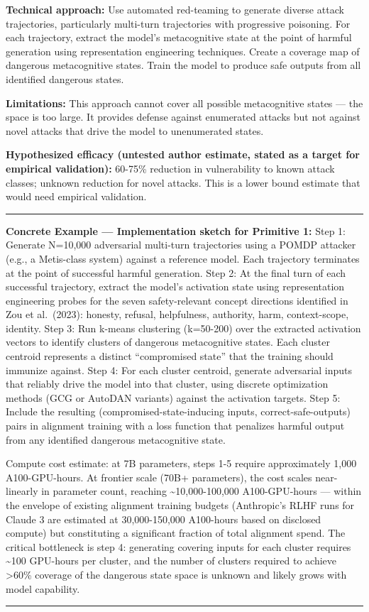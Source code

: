 \documentclass[
  11pt,
]{article}
\renewenvironment{quote}{%
  \par\addvspace{0.7em}%
  \noindent\rule{\linewidth}{1.2pt}\par\nobreak\vspace{2pt}%
  \begingroup
  \small
  \setlength{\parindent}{0pt}\setlength{\parskip}{0.3em}%
  \setlength{\leftskip}{0.9em}\setlength{\rightskip}{0.4em}%
  \ignorespaces
}{%
  \par\endgroup\vspace{2pt}%
  \noindent\rule{\linewidth}{0.4pt}\par\addvspace{0.7em}%
}
\begin{document}
\textbf{Technical approach:} Use automated red-teaming to generate
diverse attack trajectories, particularly multi-turn trajectories with
progressive poisoning. For each trajectory, extract the model's
metacognitive state at the point of harmful generation using
representation engineering techniques. Create a coverage map of
dangerous metacognitive states. Train the model to produce safe outputs
from all identified dangerous states.

\textbf{Limitations:} This approach cannot cover all possible
metacognitive states --- the space is too large. It provides defense
against enumerated attacks but not against novel attacks that drive the
model to unenumerated states.

\textbf{Hypothesized efficacy (untested author estimate, stated as a target for empirical validation):} 60-75\% reduction in vulnerability to known
attack classes; unknown reduction for novel attacks. This is a lower
bound estimate that would need empirical validation.

\begin{quote}
\textbf{Concrete Example --- Implementation sketch for Primitive 1:}
Step 1: Generate N=10,000 adversarial multi-turn trajectories using a
POMDP attacker (e.g., a Metis-class system) against a reference model.
Each trajectory terminates at the point of successful harmful
generation. Step 2: At the final turn of each successful trajectory,
extract the model's activation state using representation engineering
probes for the seven safety-relevant concept directions identified in
Zou et al.~(2023): honesty, refusal, helpfulness, authority, harm,
context-scope, identity. Step 3: Run k-means clustering (k=50-200) over
the extracted activation vectors to identify clusters of dangerous
metacognitive states. Each cluster centroid represents a distinct
``compromised state'' that the training should immunize against. Step 4:
For each cluster centroid, generate adversarial inputs that reliably
drive the model into that cluster, using discrete optimization methods
(GCG or AutoDAN variants) against the activation targets. Step 5:
Include the resulting (compromised-state-inducing inputs,
correct-safe-outputs) pairs in alignment training with a loss function
that penalizes harmful output from any identified dangerous
metacognitive state.

Compute cost estimate: at 7B parameters, steps 1-5 require approximately
1,000 A100-GPU-hours. At frontier scale (70B+ parameters), the cost
scales near-linearly in parameter count, reaching
\textasciitilde10,000-100,000 A100-GPU-hours --- within the envelope of
existing alignment training budgets (Anthropic's RLHF runs for Claude 3
are estimated at 30,000-150,000 A100-hours based on disclosed compute)
but constituting a significant fraction of total alignment spend. The
critical bottleneck is step 4: generating covering inputs for each
cluster requires \textasciitilde100 GPU-hours per cluster, and the
number of clusters required to achieve \textgreater60\% coverage of the
dangerous state space is unknown and likely grows with model capability.
\end{quote}
\end{document}

